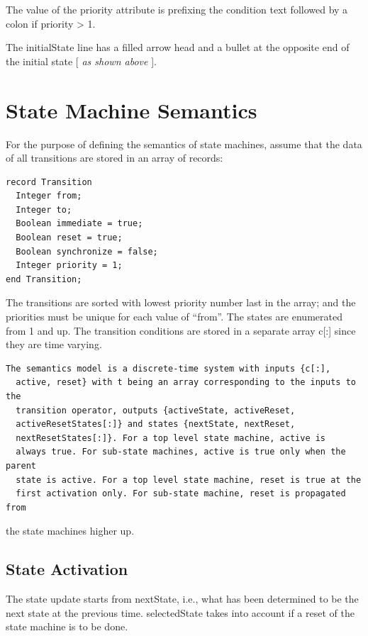 \documentclass[10pt,a4paper]{report}
\def\doublelabel#1{\label{#1}\hypertarget{#1}{}}
\begin{document}
The value of the priority attribute is prefixing the condition text
followed by a colon if priority \textgreater{} 1.

The initialState line has a filled arrow head and a bullet at the
opposite end of the initial state {[} \emph{as shown above} {]}.

\section{State Machine Semantics}\doublelabel{state-machine-semantics}

For the purpose of defining the semantics of state machines, assume that
the data of all transitions are stored in an array of records:

\begin{lstlisting}[language=modelica]
record Transition
  Integer from;
  Integer to;
  Boolean immediate = true;
  Boolean reset = true;
  Boolean synchronize = false;
  Integer priority = 1;
end Transition;
\end{lstlisting}

The transitions are sorted with lowest priority number last in the
array; and the priorities must be unique for each value of ``from''. The
states are enumerated from 1 and up. The transition conditions are
stored in a separate array c{[}:{]} since they are time varying.

\begin{lstlisting}[language=modelica]
  The semantics model is a discrete-time system with inputs {c[:],
  active, reset} with t being an array corresponding to the inputs to the
  transition operator, outputs {activeState, activeReset,
  activeResetStates[:]} and states {nextState, nextReset,
  nextResetStates[:]}. For a top level state machine, active is
  always true. For sub-state machines, active is true only when the parent
  state is active. For a top level state machine, reset is true at the
  first activation only. For sub-state machine, reset is propagated from
\end{lstlisting}
the state machines higher up.

\subsection{State Activation}\doublelabel{state-activation}

The state update starts from nextState, i.e., what has been determined
to be the next state at the previous time. selectedState takes into
account if a reset of the state machine is to be done.
\end{document}
